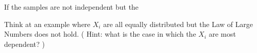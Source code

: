%
%
%
      	
	
	If the samples are not independent but the 
      	\begin{ExerciseList}
      		\Exercise Think at an example where $X_i$ are all equally distributed but the Law of Large Numbers does not hold. ( Hint: what is the case in which the $X_i$ are most dependent? )
      	\end{ExerciseList}
      	

